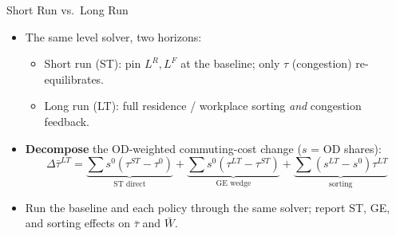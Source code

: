 \documentclass[11pt,aspectratio=169]{beamer}
\newcommand{\good}[1]{\textcolor{blue!70!black}{#1}}
\begin{document}
\begin{frame}{Short Run vs.\ Long Run}
\begin{itemize}
  \item The same level solver, two horizons:
  \begin{itemize}\footnotesize
    \item \good{Short run (ST)}: pin $L^R,L^F$ at the baseline; only $\tau$ (congestion) re-equilibrates.
    \item \good{Long run (LT)}: full residence / workplace sorting \emph{and} congestion feedback.
  \end{itemize}
  \item \textbf{Decompose} the OD-weighted commuting-cost change ($s$ = OD shares):
  \vspace{-0.4em}\begin{equation}
    \Delta\bar\tau^{LT}=\underbrace{\textstyle\sum s^0(\tau^{ST}\!-\tau^0)}_{\text{ST direct}}
    +\underbrace{\textstyle\sum s^0(\tau^{LT}\!-\tau^{ST})}_{\text{GE wedge}}
    +\underbrace{\textstyle\sum(s^{LT}\!-s^0)\tau^{LT}}_{\text{sorting}}
  \end{equation}
  \item Run the baseline and each policy through the same solver; report ST, GE, and sorting effects on $\bar\tau$ and $\bar W$.
\end{itemize}
\end{frame}

\end{document}
